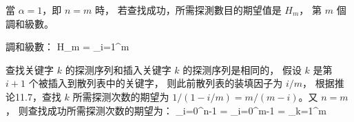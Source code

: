 \startEXERCISE\DIFFICULT
當 $\alpha=1$，即 $n=m$ 時，
若查找成功，所需探測數目的期望值是 $H_m$，
第 $m$ 個調和級數。
\stopEXERCISE

\startANSWER
調和級數：
\startformula
H_m = \sum_{i=1}^{m}
\stopformula

查找关键字 $k$ 的探测序列和插入关键字 $k$ 的探测序列是相同的，
假设 $k$ 是第 $i+1$ 个被插入到散列表中的关键字，
则此前散列表的装填因子为 $i/m$，
根据推论11.7，查找 $k$ 所需探测次数的期望为
 $1/(1-i/m)=m/(m-i)$。又 $n=m$，
则查找成功所需探测次数的期望为：
\startsplitformula\startmathalignment
\NC {}\sum_{i=0}^{n-1}
    \NC = \sum_{i=0}^{m-1} \NR
\NC \NC = \sum_{k=1}^{m} \NR
\stopmathalignment\stopsplitformula
\stopANSWER
